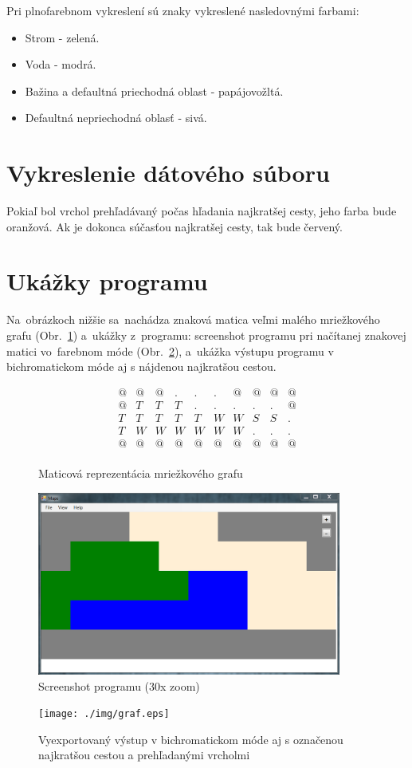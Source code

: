 Pri plnofarebnom vykreslení sú znaky vykreslené nasledovnými farbami:
\begin{itemize}
\item Strom - zelená.
\item Voda - modrá.
\item Bažina a defaultná priechodná oblast - papájovožltá.
\item Defaultná nepriechodná oblasť - sivá.
\end{itemize}


\section{Vykreslenie dátového súboru}
Pokiaľ bol vrchol prehľadávaný počas hľadania najkratšej cesty, jeho farba bude oranžová. Ak je dokonca súčasťou najkratšej cesty, 
tak bude červený.

\section{Ukážky programu}


Na~obrázkoch nižšie sa~nachádza znaková matica veľmi malého mriežkového
 grafu (Obr.~\ref{fig:testmap_znakova_matica}) a~ukážky z~programu:
 screenshot programu pri načítanej znakovej matici vo~farebnom móde (Obr.~\ref{fig:testmap_program_color}),
 a~ukážka výstupu programu v bichromatickom móde aj s nájdenou najkratšou cestou.



\begin{figure}[h]
\centering
$$
  \begin{matrix}
    @&@&@&.&.&.&@&@&@&@ \\
    @&T&T&T&.&.&.&.&.&@\\
    T&T&T&T&T&W&W&S&S&.\\
    T&W&W&W&W&W&W&.&.&.\\
    @&@&@&@&@&@&@&@&@&@\\
  \end{matrix}
$$

\caption{Maticová reprezentácia mriežkového grafu}
\label{fig:testmap_znakova_matica}
\end{figure}


\begin{figure}[h]
\centering
\includegraphics[width=10cm]{./img/testmap_program_color.png}
\caption{Screenshot programu (30x zoom)}
\label{fig:testmap_program_color}
\end{figure}

\begin{figure}[h]
\centering
\texttt{[image: ./img/graf.eps]}
\caption{Vyexportovaný výstup v bichromatickom móde aj s označenou najkratšou cestou a prehľadanými vrcholmi}
\label{fig:testmap_bichromatic_path}
\end{figure}
